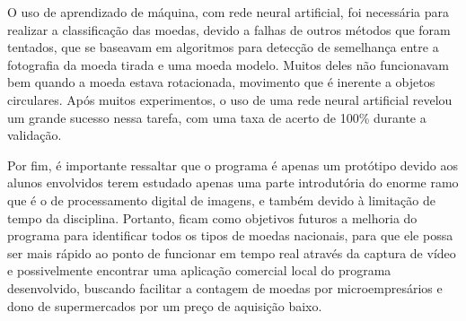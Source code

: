\documentclass[10pt,journal]{IEEEtran}
\begin{document}
O uso de aprendizado de máquina, com rede neural artificial, foi necessária para realizar a classificação das moedas, devido a falhas de outros métodos que foram tentados, que se baseavam em algoritmos para detecção de semelhança entre a fotografia da moeda tirada e uma moeda modelo. Muitos deles não funcionavam bem quando a moeda estava rotacionada, movimento que é inerente a objetos circulares.
Após muitos experimentos, o uso de uma rede neural artificial revelou um grande sucesso nessa tarefa, com uma taxa de acerto de 100\% durante a validação.

Por fim, é importante ressaltar que o programa é apenas um protótipo devido aos alunos envolvidos terem estudado apenas uma parte introdutória do enorme ramo que é o de processamento digital de imagens, e também devido à limitação de tempo da disciplina. Portanto, ficam como objetivos futuros a melhoria do programa para identificar todos os tipos de moedas nacionais, para que ele possa ser mais rápido ao ponto de funcionar em tempo real através da captura de vídeo e possivelmente encontrar uma aplicação comercial local do programa desenvolvido, buscando facilitar a contagem de moedas por microempresários e dono de supermercados por um preço de aquisição baixo.  

\medskip



\end{document}
